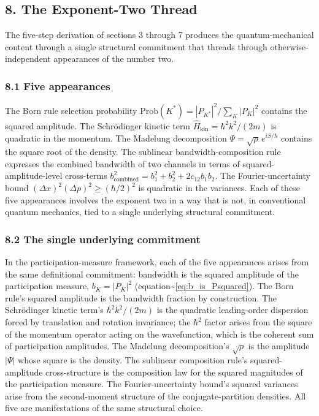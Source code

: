 \documentclass[
  11pt,
]{article}
\begin{document}
\subsection{8. The Exponent-Two Thread}\label{the-exponent-two-thread}

The five-step derivation of sections 3 through 7 produces the
quantum-mechanical content through a single structural commitment that
threads through otherwise-independent appearances of the number two.

\subsubsection{8.1 Five appearances}\label{five-appearances}

The Born rule selection probability
\(\mathrm{Prob}(K^*) = |P_{K^*}|^2 / \sum_K |P_K|^2\) contains the
squared amplitude. The Schrödinger kinetic term
\(\hat{H}_{\mathrm{kin}} = \hbar^2 k^2 / (2m)\) is quadratic in the
momentum. The Madelung decomposition
\(\Psi = \sqrt{\rho} \, e^{iS/\hbar}\) contains the square root of the
density. The sublinear bandwidth-composition rule expresses the combined
bandwidth of two channels in terms of squared-amplitude-level
cross-terms
\(b_{\mathrm{combined}}^2 = b_1^2 + b_2^2 + 2 c_{12} b_1 b_2\). The
Fourier-uncertainty bound \((\Delta x)^2 (\Delta p)^2 \geq (\hbar/2)^2\)
is quadratic in the variances. Each of these five appearances involves
the exponent two in a way that is not, in conventional quantum
mechanics, tied to a single underlying structural commitment.

\subsubsection{8.2 The single underlying
commitment}\label{the-single-underlying-commitment}

In the participation-measure framework, each of the five appearances
arises from the same definitional commitment: bandwidth is the squared
amplitude of the participation measure, \(b_K = |P_K|^2\)
(equation\textasciitilde{}\eqref{eq:b_is_Psquared}). The Born rule's
squared amplitude is the bandwidth fraction by construction. The
Schrödinger kinetic term's \(\hbar^2 k^2 / (2m)\) is the quadratic
leading-order dispersion forced by translation and rotation invariance;
the \(\hbar^2\) factor arises from the square of the momentum operator
acting on the wavefunction, which is the coherent sum of participation
amplitudes. The Madelung decomposition's \(\sqrt{\rho}\) is the
amplitude \(|\Psi|\) whose square is the density. The sublinear
composition rule's squared-amplitude cross-structure is the composition
law for the squared magnitudes of the participation measure. The
Fourier-uncertainty bound's squared variances arise from the
second-moment structure of the conjugate-partition densities. All five
are manifestations of the same structural choice.
\end{document}

